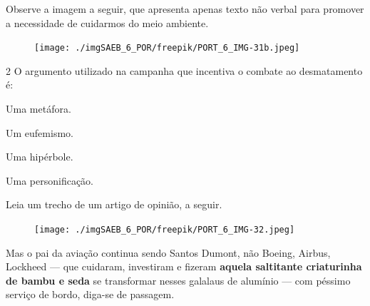 Observe a imagem a seguir, que apresenta apenas texto não verbal
para promover a necessidade de cuidarmos do meio ambiente.

\begin{figure}[H]
\centering\texttt{[image: ./imgSAEB\_6\_POR/freepik/PORT\_6\_IMG-31b.jpeg]}
\end{figure}

\num{2} O argumento utilizado na campanha que incentiva o combate ao
desmatamento é:

\pagebreak
\begin{escolha}
\item Uma metáfora.
\item Um eufemismo.
\item Uma hipérbole.
\item Uma personificação.
\end{escolha}



Leia um trecho de um artigo de opinião, a seguir.

\begin{myquote}
\begin{figure}[H]
\centering\texttt{[image: ./imgSAEB\_6\_POR/freepik/PORT\_6\_IMG-32.jpeg]}
\end{figure}

Mas o pai da aviação continua sendo Santos Dumont, não Boeing, Airbus,
Lockheed — que cuidaram, investiram e fizeram \textbf{aquela
saltitante criaturinha de bambu e seda} se transformar nesses galalaus
de alumínio — com péssimo serviço de bordo, diga-se de passagem.

\end{myquote}

